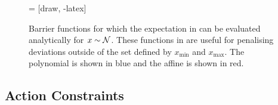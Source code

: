 \begin{figure}
\centering
{} = [draw, -latex]
\caption{Barrier functions for which the expectation in  can be evaluated analytically for $x \sim \mathcal{N}$. These functions in are useful for penalising deviations outside of the set defined by $x_{\min}$ and $x_{\max}$. The polynomial is shown in blue and the affine is shown in red.}
\label{fig:cost_barriers}
\end{figure}


\subsection{Action Constraints} \label{sec:actioncon}

